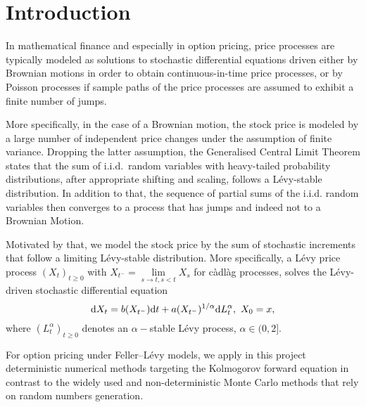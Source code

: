 \section{Introduction}
In mathematical finance 
and especially in option pricing, 
price processes 
are typically modeled as 
solutions 
to stochastic differential equations 
driven either by Brownian motions 
in order to obtain 
continuous-in-time price processes\cite{BS}, 
or by Poisson processes if 
sample paths of 
the price processes are assumed to exhibit
a finite number of jumps\cite{Merton}.

More specifically, in the case of a Brownian motion, 
the stock price is modeled by a large number of independent price changes 
under the assumption of finite variance. 
Dropping the latter assumption, the 
Generalised Central Limit Theorem\cite{GCLT} 
states that the sum of i.i.d.\ random variables with heavy-tailed probability distributions, 
after appropriate shifting and scaling, 
follows a L\'{e}vy-stable distribution. In addition to that, the sequence of partial sums of the i.i.d. random variables then converges to a process that has jumps and indeed not to a Brownian Motion.

Motivated by that, 
we model the stock price by the sum of stochastic increments that follow a 
limiting  L\'{e}vy-stable distribution. 
More specifically, a L\'{e}vy price process $(X_t)_{t\ge0}$ with $X_{t^{-}}{=}\lim\limits_{s\to t, s<t} X_s$ for c\`{a}dl\`{a}g processes, solves 
the L\'{e}vy-driven stochastic differential equation 
\begin{equation} \label{sde}
	\text{d}X_t = b(X_{t^-})\text{d}t + a(X_{t^-})^{1/\alpha}\text{d} L_t^{\alpha}, \ X_0=x,
\end{equation}
where $(L_t^{\alpha})_{t\ge0}$ denotes an $\alpha-$stable L\'{e}vy process, 
$\alpha \in (0,2]$. 

For option pricing under Feller--L\'{e}vy models, we apply in this project deterministic numerical methods targeting the Kolmogorov forward equation in contrast to the widely used and non-deterministic Monte Carlo methods that rely on random numbers generation.



